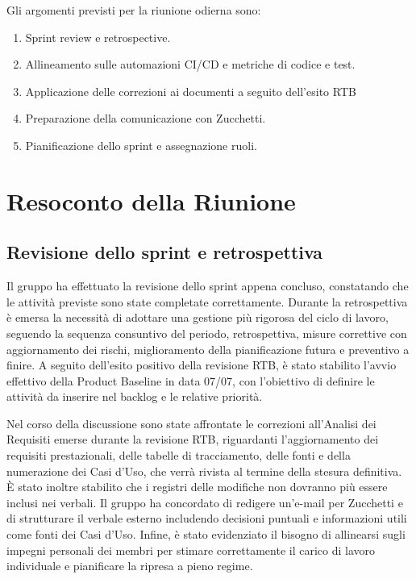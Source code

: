 Gli argomenti previsti per la riunione odierna sono:

\begin{enumerate}
    \item Sprint review e retrospective.
    \item Allineamento sulle automazioni CI/CD e metriche di codice e test.
    \item Applicazione delle correzioni ai documenti a seguito dell'esito RTB
    \item Preparazione della comunicazione con Zucchetti.
    \item Pianificazione dello sprint e assegnazione ruoli.
\end{enumerate}



\section{Resoconto della Riunione}

\subsection{Revisione dello sprint e retrospettiva}
Il gruppo ha effettuato la revisione dello sprint appena concluso, constatando che le attività previste sono state completate correttamente. Durante la retrospettiva è emersa la necessità di adottare una gestione più rigorosa del ciclo di lavoro, seguendo la sequenza consuntivo del periodo, retrospettiva, misure correttive con aggiornamento dei rischi, miglioramento della pianificazione futura e preventivo a finire. A seguito dell'esito positivo della revisione RTB, è stato stabilito l’avvio effettivo della Product Baseline in data 07/07, con l’obiettivo di definire le attività da inserire nel backlog e le relative priorità.

Nel corso della discussione sono state affrontate le correzioni all’Analisi dei Requisiti emerse durante la revisione RTB, riguardanti l'aggiornamento dei requisiti prestazionali, delle tabelle di tracciamento, delle fonti e della numerazione dei Casi d’Uso, che verrà rivista al termine della stesura definitiva. È stato inoltre stabilito che i registri delle modifiche non dovranno più essere inclusi nei verbali. Il gruppo ha concordato di redigere un’e-mail per Zucchetti e di strutturare il verbale esterno includendo decisioni puntuali e informazioni utili come fonti dei Casi d’Uso. Infine, è stato evidenziato il bisogno di allinearsi sugli impegni personali dei membri per stimare correttamente il carico di lavoro individuale e pianificare la ripresa a pieno regime.

